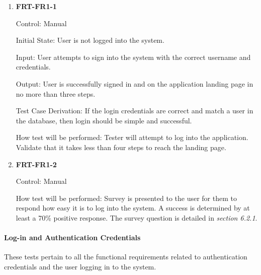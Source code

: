 \documentclass[12pt, titlepage]{article}
\begin{document}
\begin{enumerate}

\item{\textbf{FRT-FR1-1}}

Control: Manual
          
Initial State: User is not logged into the system.
          
Input: User attempts to sign into the system with the correct username and credentials.

Output: User is successfully signed in and on the application landing page in no more than three steps.

Test Case Derivation: If the login credentials are correct and match a user in the database, then login should be simple and successful.
          
How test will be performed: Tester will attempt to log into the application. Validate that it takes less than four steps to reach the landing page.

\item{\textbf{FRT-FR1-2}}

Control: Manual
          
How test will be performed: Survey is presented to the user for them to respond how easy it is to log into the system.
A success is determined by at least a 70\% positive response. The survey question is detailed in \textit{section 6.2.1}.

\end{enumerate}


\paragraph{Log-in and Authentication Credentials}

These tests pertain to all the functional requirements related to authentication credentials and the user logging in to the system.
\end{document}
